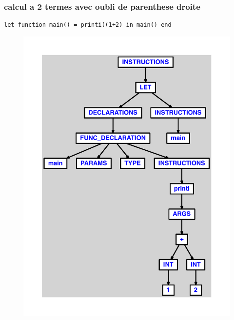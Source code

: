 \documentclass{article}
\begin{document}
\subsubsection{calcul a 2 termes avec oubli de parenthese droite}
\begin{lstlisting}
let function main() = printi((1+2) in main() end
\end{lstlisting}
\newpage
\begin{figure}[H]
\centering
\includegraphics[max width=\textwidth]{ast/ast_28.pdf}
\end{figure}
\newpage
\end{document}
